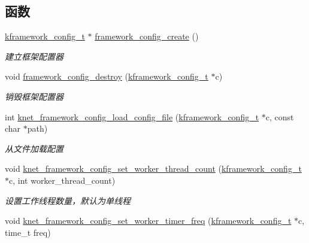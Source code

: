 \subsection*{函数}
\begin{DoxyCompactItemize}
\item 
\hyperlink{a00054_adeaf952e0f0887507ff836385bf54874_adeaf952e0f0887507ff836385bf54874}{kframework\+\_\+config\+\_\+t} $\ast$ \hyperlink{a00058_abb53b259903568ee8684e2979d5419cb_abb53b259903568ee8684e2979d5419cb}{framework\+\_\+config\+\_\+create} ()
\begin{DoxyCompactList}\small\item\em 建立框架配置器 \end{DoxyCompactList}\item 
void \hyperlink{a00058_a94f3ef660e9dd4e8c9b4a4f113c35833_a94f3ef660e9dd4e8c9b4a4f113c35833}{framework\+\_\+config\+\_\+destroy} (\hyperlink{a00054_adeaf952e0f0887507ff836385bf54874_adeaf952e0f0887507ff836385bf54874}{kframework\+\_\+config\+\_\+t} $\ast$c)
\begin{DoxyCompactList}\small\item\em 销毁框架配置器 \end{DoxyCompactList}\item 
int \hyperlink{a00111_ga45b64d2f395031b60dd33412f55242b4_ga45b64d2f395031b60dd33412f55242b4}{knet\+\_\+framework\+\_\+config\+\_\+load\+\_\+config\+\_\+file} (\hyperlink{a00054_adeaf952e0f0887507ff836385bf54874_adeaf952e0f0887507ff836385bf54874}{kframework\+\_\+config\+\_\+t} $\ast$c, const char $\ast$path)
\begin{DoxyCompactList}\small\item\em 从文件加载配置 \end{DoxyCompactList}\item 
void \hyperlink{a00111_ga470f4acf8c70060852d435753375fa3b_ga470f4acf8c70060852d435753375fa3b}{knet\+\_\+framework\+\_\+config\+\_\+set\+\_\+worker\+\_\+thread\+\_\+count} (\hyperlink{a00054_adeaf952e0f0887507ff836385bf54874_adeaf952e0f0887507ff836385bf54874}{kframework\+\_\+config\+\_\+t} $\ast$c, int worker\+\_\+thread\+\_\+count)
\begin{DoxyCompactList}\small\item\em 设置工作线程数量，默认为单线程 \end{DoxyCompactList}\item 
void \hyperlink{a00111_ga42497b09d9d0c4039a062ff750ead0a9_ga42497b09d9d0c4039a062ff750ead0a9}{knet\+\_\+framework\+\_\+config\+\_\+set\+\_\+worker\+\_\+timer\+\_\+freq} (\hyperlink{a00054_adeaf952e0f0887507ff836385bf54874_adeaf952e0f0887507ff836385bf54874}{kframework\+\_\+config\+\_\+t} $\ast$c, time\+\_\+t freq)

\end{DoxyCompactItemize}
